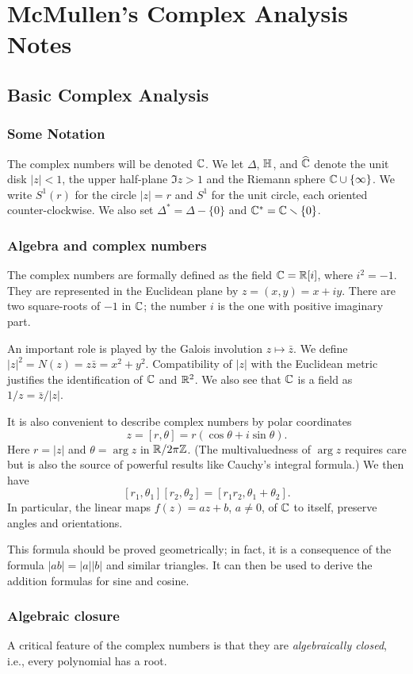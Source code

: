 \chapter{McMullen's Complex Analysis Notes}
\section{Basic Complex Analysis}
\subsection{Some Notation}
The complex numbers will be denoted $\mathbb{C}$. We let $\Delta$, $\mathbb{H}$, and
$\widehat{\mathbb{C}}$ denote the unit disk $|z|<1$, the upper half-plane $\Im z>1$
and the Riemann sphere $\mathbb{C}\cup\{\infty\}$. We write $S^1(r)$ for the
circle $|z|=r$ and $S^1$ for the unit circle, each oriented
counter-clockwise. We also set $\Delta^*=\Delta\minus\{0\}$ and
$\bbC^*=\bbC\minus\{0\}$.
\subsection{Algebra and complex numbers}
The complex numbers are formally defined as the field $\mathbb{C}=\mathbb{R}[i]$, where
$i^2=-1$. They are represented in the Euclidean plane by
$z=(x,y)=x+iy$. There are two square-roots of $-1$ in $\mathbb{C}$; the number
$i$ is the one with positive imaginary part.

An important role is played by the Galois involution $z\mapsto\bar z$. We
define $|z|^2=N(z)=z\bar z=x^2+y^2$. Compatibility of $|z|$ with the
Euclidean metric justifies the identification of $\mathbb{C}$ and $\mathbb{R}^2$. We
also see that $\mathbb{C}$ is a field as $1/z=\bar z/|z|$.

It is also convenient to describe complex numbers by polar coordinates
\[
z=[r,\theta]=r(\cos\theta+i\sin\theta).
\]
Here $r=|z|$ and $\theta=\arg z$ in $\mathbb{R}/2\pi\mathbb{Z}$. (The multivaluedness
of $\arg z$ requires care but is also the  source of powerful results like
Cauchy's integral formula.) We then have
\[
\left[r_1,\theta_1\right]\left[r_2,\theta_2\right]=
\left[r_1r_2,\theta_1+\theta_2\right].
\]
In particular, the linear maps $f(z)=az+b$, $a\neq 0$, of $\mathbb{C}$ to itself,
preserve angles and orientations.

This formula should be proved geometrically; in fact, it is a consequence
of the formula $|ab|=|a||b|$ and similar triangles. It can then be used to
derive the addition formulas for sine and cosine.

\subsection{Algebraic closure}
A critical feature of the complex numbers is that they are
\emph{algebraically closed}, i.e., every polynomial has a root.

